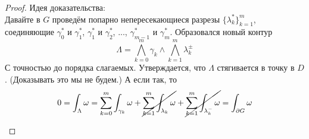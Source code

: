\documentclass{article}
\begin{document}
    \begin{proof}
        Идея доказательства:\\
        Давайте в $G$ проведём попарно непересекающиеся разрезы $\{\lambda_k^*\}_{k=1}^m$, соединяющие $\gamma_0^*$ и $\gamma_1^*$, $\gamma_1^*$ и $\gamma_2^*$, ..., $\gamma_{m-1}^*$ и $\gamma_m^*$. Образовался новый контур
        $$\Lambda=\bigwedge_{k=0}^m\gamma_k\wedge\bigwedge_{k=1}^m\lambda_k^{\pm}$$
        С точностью до порядка слагаемых. Утверждается, что $\Lambda$ стягивается в точку в $D$. (Доказывать это мы не будем.) А если так, то
        $$
        0=\int_\Lambda\omega=\sum_{k=0}^m\int_{\gamma_k}\omega+\cancel{\sum_{k=1}^m\int_{\lambda_k}\omega}+\cancel{\sum_{k=1}^m\int_{\lambda_k^-}\omega}=\int_{\partial G}\omega
        $$
        \begin{figure}[H]
            \begin{tikzpicture}[yscale=-.04,xscale=.04]
                

\end{tikzpicture}
\end{figure}
\end{proof}
\end{document}
